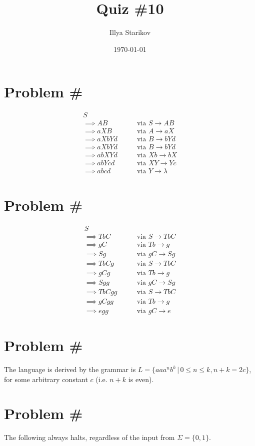 \documentclass[12pt]{article}
\title{Quiz \#10}
\date{\today}
\author{Illya Starikov}
\newcommand{\problem}{
    \addtocounter{section}{1}
    \section*{Problem \#\thesection}
}
\begin{document}
\maketitle

\problem
\begin{align*}
    S& \\
    \implies AB &\quad\quad \text{via $S \rightarrow AB$} \\
    \implies aXB &\quad\quad \text{via $A \rightarrow aX$} \\
    \implies aXbYd &\quad\quad \text{via $B \rightarrow bYd$} \\
    \implies aXbYd &\quad\quad \text{via $B \rightarrow bYd$} \\
    \implies abXYd &\quad\quad \text{via $Xb \rightarrow bX$} \\
    \implies abYcd &\quad\quad \text{via $XY \rightarrow Yc$} \\
    \implies abcd &\quad\quad \text{via $Y \rightarrow \lambda$}
\end{align*}

\problem
\begin{align*}
    S& \\
    \implies TbC &\quad\quad \text{via $S \rightarrow TbC$} \\
    \implies gC &\quad\quad \text{via $Tb \rightarrow g$} \\
    \implies Sg &\quad\quad \text{via $gC \rightarrow Sg$} \\
    \implies TbCg &\quad\quad \text{via $S \rightarrow TbC$} \\
    \implies gCg &\quad\quad \text{via $Tb \rightarrow g$} \\
    \implies Sgg &\quad\quad \text{via $gC \rightarrow Sg$} \\
    \implies TbCgg &\quad\quad \text{via $S \rightarrow TbC$} \\
    \implies gCgg &\quad\quad \text{via $Tb \rightarrow g$} \\
    \implies egg &\quad\quad \text{via $gC \rightarrow e$}
\end{align*}


\problem
The language is derived by the grammar is $L = \{ aa a^n b^k \, | \, 0 \leq n \leq k,  n + k = 2c \} $, for some arbitrary constant $c$ (i.e. $n + k$ is even).

\problem
The following always halts, regardless of the input from $\Sigma = \{ 0, 1 \}$.

\begin{center}
\end{center}
\end{document}
